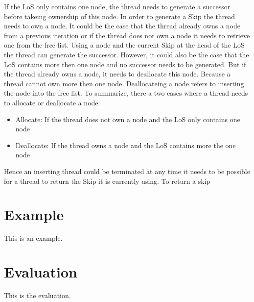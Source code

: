 \documentclass[sigconf,nonacm]{acmart}
\begin{document}
        If the LoS only contains one node, the thread needs to generate a successor before takeing ownership of this node. In order to generate a Skip the thread needs to own a node. It could be the case that the thread already owns a node from a previous iteration or if the thread does not own a node it needs to retrieve one from the free list. Using a node and the current Skip at the head of the LoS the thread can generate the successor. However, it could also be the case that the LoS contains more then one node and no successor needs to be generated. But if the thread already owns a node, it needs to deallocate this node. Because a thread cannot own more then one node. Deallocateing a node refers to inserting the node into the free list. To summarize, there a two cases where a thread needs to allocate or deallocate a node: 
        \begin{itemize}
            \item Allocate: If the thread does not own a node and the LoS only contains one node
            \item Deallocate: If the thread owns a node and the LoS contains more the one node
        \end{itemize}

        Hence an inserting thread could be terminated at any time it needs to be possible for a thread to return the Skip it is currently using. To return a skip 

    \section{Example}
        This is an example.

    \section{Evaluation}
        This is the evaluation.
\end{document}
